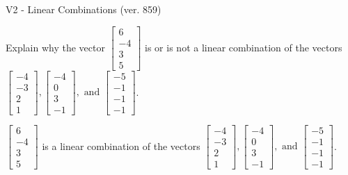 \begin{exercise}
  \begin{exerciseTitle}V2 - Linear Combinations (ver. 859)\end{exerciseTitle}
  \begin{exerciseStatement}
    Explain why the vector \(\left[\begin{array}{c}
6 \\
-4 \\
3 \\
5
\end{array}\right]\)  is or is not a linear 
	combination of the vectors \(\left[\begin{array}{c}
-4 \\
-3 \\
2 \\
1
\end{array}\right] , \left[\begin{array}{c}
-4 \\
0 \\
3 \\
-1
\end{array}\right] , \text{ and } \left[\begin{array}{c}
-5 \\
-1 \\
-1 \\
-1
\end{array}\right]\).
	


  \end{exerciseStatement}
  \begin{exerciseAnswer}
   \(\left[\begin{array}{c}
6 \\
-4 \\
3 \\
5
\end{array}\right]\) 
  	 is  
	a linear combination of the vectors \(\left[\begin{array}{c}
-4 \\
-3 \\
2 \\
1
\end{array}\right] , \left[\begin{array}{c}
-4 \\
0 \\
3 \\
-1
\end{array}\right] , \text{ and } \left[\begin{array}{c}
-5 \\
-1 \\
-1 \\
-1
\end{array}\right]\).

	
  


  \end{exerciseAnswer}
\end{exercise}